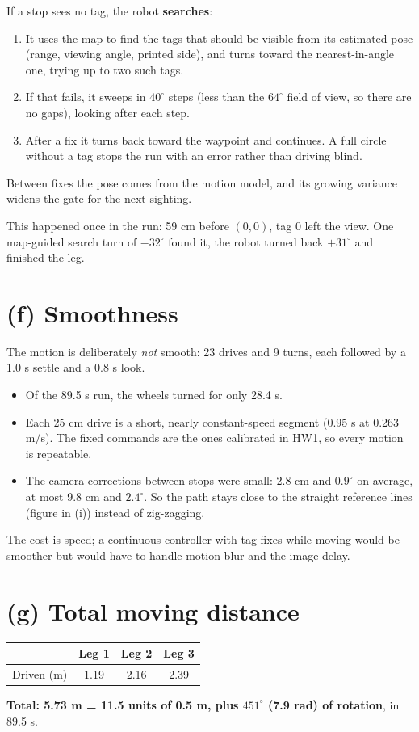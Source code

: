 \documentclass[10pt]{article}
\begin{document}
If a stop sees no tag, the robot \textbf{searches}:
\begin{enumerate}
  \item It uses the map to find the tags that should be visible from its estimated pose (range, viewing angle, printed side), and turns toward the nearest-in-angle one, trying up to two such tags.
  \item If that fails, it sweeps in $40^\circ$ steps (less than the $64^\circ$ field of view, so there are no gaps), looking after each step.
  \item After a fix it turns back toward the waypoint and continues. A full circle without a tag stops the run with an error rather than driving blind.
\end{enumerate}
Between fixes the pose comes from the motion model, and its growing variance widens the gate for the next sighting.

This happened once in the run: 59 cm before $(0,0)$, tag 0 left the view. One map-guided search turn of $-32^\circ$ found it, the robot turned back $+31^\circ$ and finished the leg.

\section*{(f) Smoothness}
The motion is deliberately \emph{not} smooth: 23 drives and 9 turns, each followed by a 1.0 s settle and a 0.8 s look.
\begin{itemize}
  \item Of the 89.5 s run, the wheels turned for only 28.4 s.
  \item Each 25 cm drive is a short, nearly constant-speed segment (0.95 s at 0.263 m/s). The fixed commands are the ones calibrated in HW1, so every motion is repeatable.
  \item The camera corrections between stops were small: 2.8 cm and $0.9^\circ$ on average, at most 9.8 cm and $2.4^\circ$. So the path stays close to the straight reference lines (figure in (i)) instead of zig-zagging.
\end{itemize}
The cost is speed; a continuous controller with tag fixes while moving would be smoother but would have to handle motion blur and the image delay.

\section*{(g) Total moving distance}
\begin{center}
\small
\begin{tabular}{lccc}
\toprule
 & Leg 1 & Leg 2 & Leg 3 \\
\midrule
Driven (m) & 1.19 & 2.16 & 2.39 \\
\bottomrule
\end{tabular}
\end{center}
\textbf{Total: 5.73 m = 11.5 units of 0.5 m, plus $451^\circ$ (7.9 rad) of rotation}, in 89.5 s.
\end{document}
